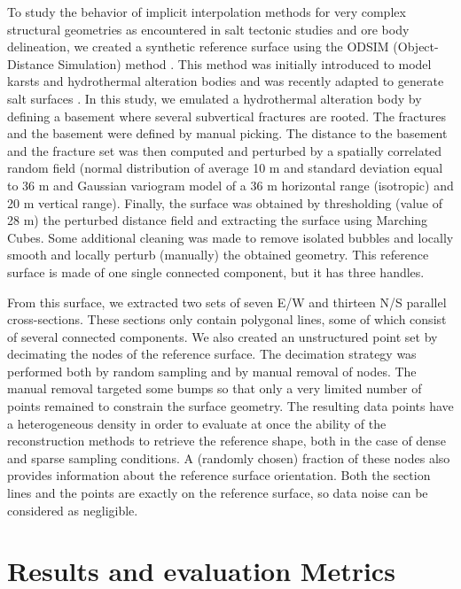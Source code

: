 \documentclass[preprint]{ring20}
\begin{document}
{To study the behavior of implicit interpolation methods for very complex structural geometries as encountered in salt tectonic studies and ore body delineation, we created a synthetic reference surface using the ODSIM (Object-Distance Simulation) method \citep{Henrion2010MG}. This method was initially introduced to model karsts and hydrothermal alteration bodies \citep{Henrion2008PEIGC,Rongier2014G} and was recently adapted to generate salt surfaces \citep{Clausolles20188ECE2}. In this study, we emulated a hydrothermal alteration body by defining a basement where several subvertical fractures are rooted. The fractures and the basement were defined by manual picking. The distance to the basement and the fracture set was then computed and perturbed by a spatially correlated random field (normal distribution of average 10 m and standard deviation equal to 36 m and Gaussian variogram model of a 36 m horizontal range (isotropic) and 20 m vertical range). Finally, the surface was obtained 
by thresholding (value of 28 m) the perturbed distance field and extracting the surface using Marching Cubes. Some additional cleaning was made to remove isolated bubbles and locally smooth and locally perturb (manually) the obtained geometry. This reference surface is made of one single connected component, but it has three handles. 

From this surface, we extracted two sets of seven E/W and thirteen N/S parallel cross-sections. These sections only contain polygonal lines, some of which consist of several connected components. We also created an unstructured point set by decimating the nodes of the reference surface. The decimation strategy was performed both by random sampling and by manual removal of nodes. The manual removal targeted some bumps so that only a very limited number of points remained to constrain the surface geometry. The resulting data points have a heterogeneous density in order to evaluate at once the ability of the reconstruction methods to retrieve the reference shape, both in the case of dense and sparse sampling conditions. A (randomly chosen) fraction of these nodes also provides information about the reference surface orientation. Both the section lines and the points are exactly on the reference surface, so data noise can be considered as negligible. 


\section{Results and evaluation Metrics}
\label{sec:results}

}
\end{document}
